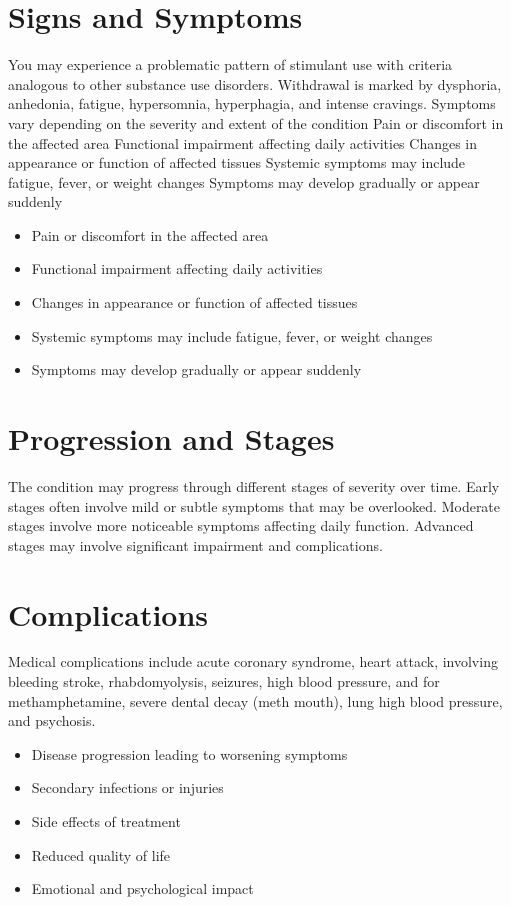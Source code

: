 \section{Signs and Symptoms}
You may experience a problematic pattern of stimulant use with criteria analogous to other substance use disorders. Withdrawal is marked by dysphoria, anhedonia, fatigue, hypersomnia, hyperphagia, and intense cravings. Symptoms vary depending on the severity and extent of the condition Pain or discomfort in the affected area Functional impairment affecting daily activities Changes in appearance or function of affected tissues Systemic symptoms may include fatigue, fever, or weight changes Symptoms may develop gradually or appear suddenly

\begin{itemize}[noitemsep]
  \item Pain or discomfort in the affected area
  \item Functional impairment affecting daily activities
  \item Changes in appearance or function of affected tissues
  \item Systemic symptoms may include fatigue, fever, or weight changes
  \item Symptoms may develop gradually or appear suddenly
\end{itemize}
\section{Progression and Stages}
The condition may progress through different stages of severity over time. Early stages often involve mild or subtle symptoms that may be overlooked. Moderate stages involve more noticeable symptoms affecting daily function. Advanced stages may involve significant impairment and complications.
\section{Complications}
Medical complications include acute coronary syndrome, heart attack, involving bleeding stroke, rhabdomyolysis, seizures, high blood pressure, and for methamphetamine, severe dental decay (meth mouth), lung high blood pressure, and psychosis.

\begin{itemize}[noitemsep]
  \item Disease progression leading to worsening symptoms
  \item Secondary infections or injuries
  \item Side effects of treatment
  \item Reduced quality of life
  \item Emotional and psychological impact
\end{itemize}
